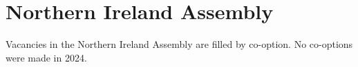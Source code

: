 \documentclass[a4paper,openany]{book}
\begin{document}
%
%

\section{Northern Ireland Assembly}

Vacancies in the Northern Ireland Assembly are filled by co-option.
No co-options were made in 2024.
%
\end{document}
